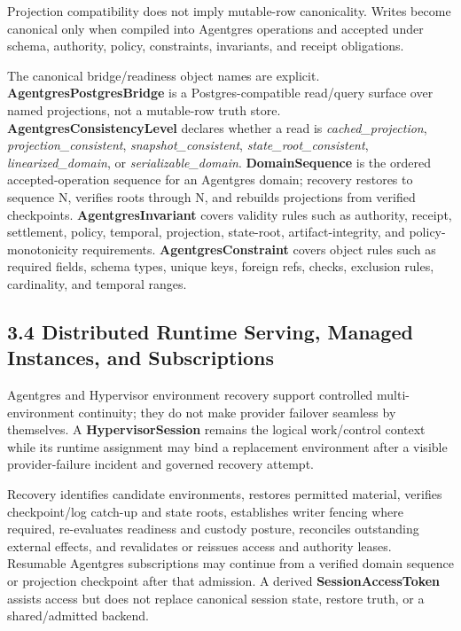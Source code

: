 \documentclass[
  11pt,
]{article}
\begin{document}
Projection compatibility does not imply mutable-row canonicality. Writes
become canonical only when compiled into Agentgres operations and
accepted under schema, authority, policy, constraints, invariants, and
receipt obligations.

The canonical bridge/readiness object names are explicit.
\textbf{AgentgresPostgresBridge} is a Postgres-compatible read/query
surface over named projections, not a mutable-row truth store.
\textbf{AgentgresConsistencyLevel} declares whether a read is
\emph{cached\_projection}, \emph{projection\_consistent},
\emph{snapshot\_consistent}, \emph{state\_root\_consistent},
\emph{linearized\_domain}, or \emph{serializable\_domain}.
\textbf{DomainSequence} is the ordered accepted-operation sequence for
an Agentgres domain; recovery restores to sequence N, verifies roots
through N, and rebuilds projections from verified checkpoints.
\textbf{AgentgresInvariant} covers validity rules such as authority,
receipt, settlement, policy, temporal, projection, state-root,
artifact-integrity, and policy-monotonicity requirements.
\textbf{AgentgresConstraint} covers object rules such as required
fields, schema types, unique keys, foreign refs, checks, exclusion
rules, cardinality, and temporal ranges.

\hypertarget{distributed-runtime-serving-managed-instances-and-subscriptions}{%
\subsection{3.4 Distributed Runtime Serving, Managed Instances, and
Subscriptions}\label{distributed-runtime-serving-managed-instances-and-subscriptions}}

Agentgres and Hypervisor environment recovery support controlled
multi-environment continuity; they do not make provider failover seamless by
themselves. A \textbf{HypervisorSession} remains the logical work/control
context while its runtime assignment may bind a replacement environment after
a visible provider-failure incident and governed recovery attempt.

Recovery identifies candidate environments, restores permitted material,
verifies checkpoint/log catch-up and state roots, establishes writer fencing
where required, re-evaluates readiness and custody posture, reconciles
outstanding external effects, and revalidates or reissues access and authority
leases. Resumable Agentgres subscriptions may continue from a verified domain
sequence or projection checkpoint after that admission. A derived
\textbf{SessionAccessToken} assists access but does not replace canonical
session state, restore truth, or a shared/admitted backend.
\end{document}

